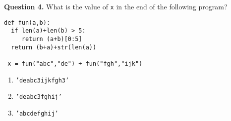 \documentclass[12pt]{article}
\begin{document}
{\bf Question 4.} What is the value of \texttt{x} in the end of the following program?
\begin{lstlisting}[frame=single]
def fun(a,b):
  if len(a)+len(b) > 5:
     return (a+b)[0:5]
  return (b+a)+str(len(a))
  
 x = fun("abc","de") + fun("fgh","ijk")
  \end{lstlisting}
  \vspace{-0.5cm}
  \begin{enumerate}[label=\Alph*]
   \item  \texttt{'deabc3ijkfgh3'}
   \item  \texttt{'deabc3fghij'} %
   \item  \texttt{'abcdefghij'}
  \end{enumerate}
\end{document}
